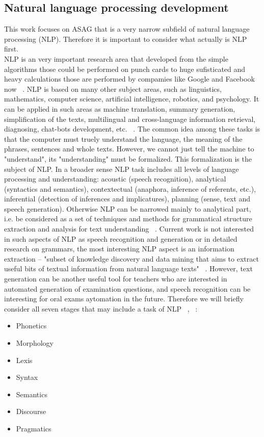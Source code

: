 \documentclass[11pt]{report}
\numberwithin{equation}{section} %
\begin{document}
\subsection{Natural language processing development}

This work focuses on ASAG that is a very narrow subfield of natural language processing (NLP). Therefore it is important to consider what actually is NLP first.\\

NLP is an very important research area that developed from the simple algorithms those could be performed on punch cards to huge sufisticated and heavy calculations those are performed by compamies like Google and Facebook now ~\cite{Cambria}. NLP is based on many other subject areas, such as linguistics, mathematics, computer science, artificial intelligence, robotics, and psychology. It can be applied in such areas as machine translation, summary generation, simplification of the texts, multilingual and cross-language information retrieval, diagnosing, chat-bots development, etc. ~\cite{Chowdhury}. The common idea among these tasks is that the computer must truely understand the language, the meaning of the phrases, sentences and whole texts. However, we cannot just tell the machine to "understand", its "understanding" must be formalized. This formalization is the subject of NLP. In a broader sense NLP task includes all levels of language processing and understanding: acoustic (speech recognition), analytical (syntactics and semantics), contextectual (anaphora, inference of referents, etc.), inferential (detection of inferences and implicatures), planning (sense, text and speech generation). Otherwise NLP can be narrowed mainly to analytical part, i.e. be considered as a set of techniques and methods for grammatical structure extraction and analysis for text understanding  ~\cite{Steedman}. Current work is not interested in such aspects of NLP as speech recognition and generation or in detailed research on grammars, the most interesting NLP aspect is an information extraction -- "subset of knowledge discovery and data mining that aims to extract useful bits of textual information from natural language texts" ~\cite{Chowdhury}.
However, text generation can be another useful tool for teachers who are interested in automated generation of examination questions, and speech recognition can be interesting for oral exams aytomation in the future. Therefore we will briefly consider all seven stages that may include a task of NLP ~\cite{Chowdhury}, ~\cite{Saad}:
\begin{itemize}
\item Phonetics
\item Morphology
\item Lexis 
\item Syntax
\item Semantics
\item Discourse
\item Pragmatics
\end{itemize}
 
\end{document}
